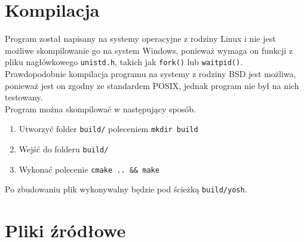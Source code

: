 \documentclass{article}
\begin{document}
\section{Kompilacja}

Program został napisany na systemy operacyjne z rodziny Linux i nie jest możliwe skompilowanie go na system Windows,
ponieważ wymaga on funkcji z pliku nagłówkowego \texttt{unistd.h}, takich jak \texttt{fork()} lub \texttt{waitpid()}. 
Prawdopodobnie kompilacja programu na systemy z rodziny BSD jest możliwa, ponieważ jest on zgodny ze standardem POSIX, 
jednak program nie był na nich testowany.\\
Program można skompilować w następujący sposób.
    \begin{enumerate}
            \item Utworzyć folder \texttt{build/} poleceniem \texttt{mkdir build}
            \item Wejść do folderu  \texttt{build/}
            \item Wykonać polecenie \texttt{cmake .. \&\& make}
    \end{enumerate}

Po zbudowaniu plik wykonywalny będzie pod ścieżką \texttt{build/yosh}.

\section{Pliki źródłowe}
\end{document}

